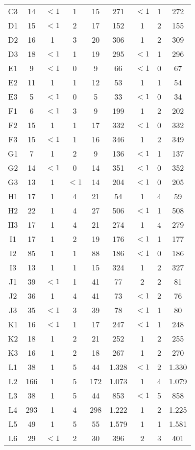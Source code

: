\begin{center}
\begin{longtable}{ccccc|cccc}
C3&14&$<1$&1&15&271&$<1$&1&272\\
D1&15&$<1$&2&17&152&1&2&155\\
D2&16&1&3&20&306&1&2&309\\
D3&18&$<1$&1&19&295&$<1$&1&296\\
E1&9&$<1$&0&9&66&$<1$&0&67\\
E2&11&1&1&12&53&1&1&54\\
E3&5&$<1$&0&5&33&$<1$&0&34\\
F1&6&$<1$&3&9&199&1&2&202\\
F2&15&1&1&17&332&$<1$&0&332\\
F3&15&$<1$&1&16&346&1&2&349\\
G1&7&1&2&9&136&$<1$&1&137\\
G2&14&$<1$&0&14&351&$<1$&0&352\\
G3&13&1&$<1$&14&204&$<1$&0&205\\
H1&17&1&4&21&54&1&4&59\\
H2&22&1&4&27&506&$<1$&1&508\\
H3&17&1&4&21&274&1&4&279\\
I1&17&1&2&19&176&$<1$&1&177\\
I2&85&1&1&88&186&$<1$&0&186\\
I3&13&1&1&15&324&1&2&327\\
J1&39&$<1$&1&41&77&2&2&81\\
J2&36&1&4&41&73&$<1$&2&76\\
J3&35&$<1$&3&39&78&$<1$&1&80\\
K1&16&$<1$&1&17&247&$<1$&1&248\\
K2&18&1&2&21&252&1&2&255\\
K3&16&1&2&18&267&1&2&270\\
L1&38&1&5&44&1.328&$<1$&2&1.330\\
L2&166&1&5&172&1.073&1&4&1.079\\
L3&38&1&5&44&853&$<1$&5&858\\
L4&293&1&4&298&1.222&1&2&1.225\\
L5&49&1&5&55&1.579&1&1&1.581\\
L6&29&$<1$&2&30&396&2&3&401\\

\end{longtable}
\end{center}

